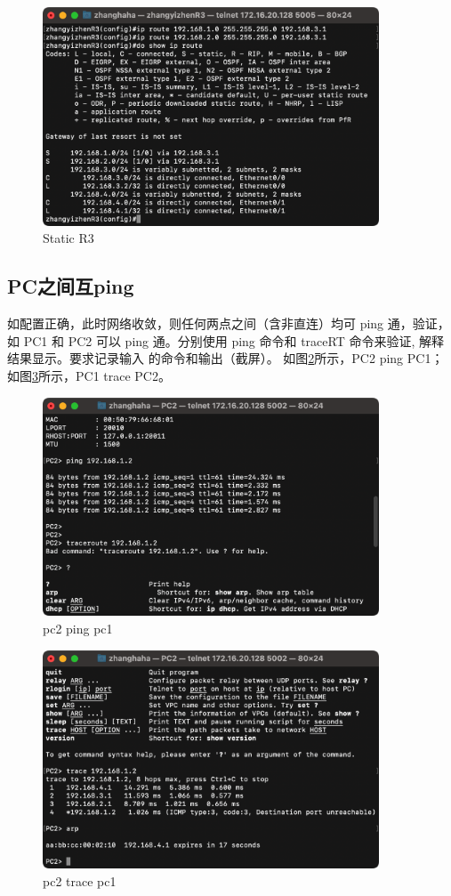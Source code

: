 \documentclass[a4paper,12pt]{report}
\begin{document}
\begin{spacing}{1.5}
\begin{figure}[htb!]
  \centering
\includegraphics[width=10cm]{figure/R3s.png}
\caption{Static R3}
\label{16}
\end{figure}


\subsection{PC之间互ping}
如配置正确，此时网络收敛，则任何两点之间（含非直连）均可 ping 通，验证，如 PC1 和 PC2 可以 ping 通。分别使用 ping 命令和 traceRT 命令来验证, 解释结果显示。要求记录输入 的命令和输出（截屏）。
如图\ref{17}所示，PC2 ping PC1；如图\ref{18}所示，PC1 trace PC2。
\begin{figure}[htb!]
  \centering
\includegraphics[width=10cm]{figure/pc2pingpc1.png}
\caption{pc2 ping pc1}
\label{17}
\end{figure}
\begin{figure}[htb!]
  \centering
\includegraphics[width=10cm]{figure/pc2tracepc1.png}
\caption{pc2 trace pc1}
\label{18}
\end{figure}


\end{spacing}
\end{document}

